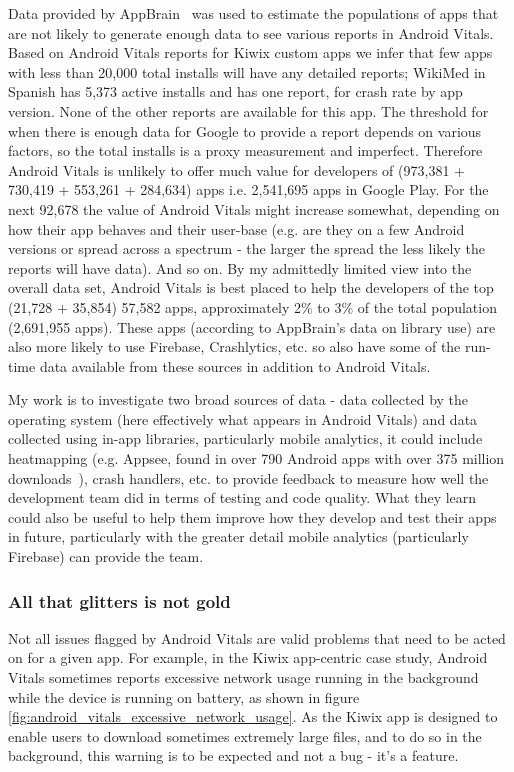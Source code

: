 Data provided by AppBrain~\cite{appbrain_download_statistics_june_2019} was used to estimate the populations of apps that are not likely to generate enough data to see various reports in Android Vitals.
% 
Based on Android Vitals reports for Kiwix custom apps we infer that few apps with less than 20,000 total installs will have any detailed reports; WikiMed in Spanish has 5,373 active installs and has one report, for crash rate by app version. None of the other reports are available for this app. The threshold for when there is enough data for Google to provide a report depends on various factors, so the total installs is a proxy measurement and imperfect. Therefore Android Vitals is unlikely to offer much value for developers of (973,381 + 730,419 + 553,261 + 284,634) apps i.e. 2,541,695 apps in Google Play. For the next 92,678 the value of Android Vitals might increase somewhat, depending on how their app behaves and their user-base (e.g. are they on a few Android versions or spread across a spectrum - the larger the spread the less likely the reports will have data). And so on. By my admittedly limited view into the overall data set, Android Vitals is best placed to help the developers of the top (21,728 + 35,854) 57,582 apps, approximately 2\% to 3\% of the total population (2,691,955 apps). These apps (according to AppBrain's data on library use) are also more likely to use Firebase, Crashlytics, etc. so also have some of the run-time data available from these sources in addition to Android Vitals.

My work is to investigate two broad sources of data - data collected by the operating system (here effectively what appears in Android Vitals) and data collected using in-app libraries, particularly mobile analytics, it could include heatmapping (e.g. Appsee, found in over 790 Android apps with over 375 million downloads~\cite{appbrain_appsee}), crash handlers, etc. to provide feedback to measure how well the development team did in terms of testing and code quality. What they learn could also be useful to help them improve how they develop and test their apps in future, particularly with the greater detail mobile analytics (particularly Firebase) can provide the team.

\subsubsection{All that glitters is not gold}
Not all issues flagged by Android Vitals are valid problems that need to be acted on for a given app. For example, in the Kiwix app-centric case study, Android Vitals sometimes reports excessive network usage running in the background while the device is running on battery, as shown in figure \ref{fig:android_vitals_excessive_network_usage}. As the Kiwix app is designed to enable users to download sometimes extremely large files, and to do so in the background, this warning is to be expected and not a bug - it's a feature.


